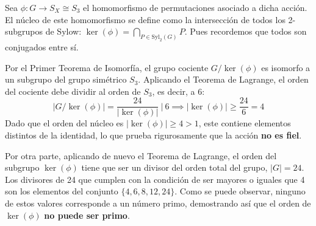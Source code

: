 \documentclass[12pt]{article}
\begin{document}
\begin{ejercicio}[0.5 puntos]
\begin{enumerate}[label=\alph*)]
            Sea $\phi: G \to S_X \cong S_3$ el homomorfismo de permutaciones asociado a dicha acción. El núcleo de este homomorfismo se define como la intersección de todos los 2-subgrupos de Sylow: $\ker(\phi) = \bigcap_{P \in \text{Syl}_2(G)} P$. Pues recordemos que todos son conjugados entre sí.
            
            Por el Primer Teorema de Isomorfía, el grupo cociente $G/\ker(\phi)$ es isomorfo a un subgrupo del grupo simétrico $S_3$. Aplicando el Teorema de Lagrange, el orden del cociente debe dividir al orden de $S_3$, es decir, a $6$:
            \[ |G/\ker(\phi)| = \frac{24}{|\ker(\phi)|} \ \Big| \ 6 \implies |\ker(\phi)| \ge \frac{24}{6} = 4 \]
            Dado que el orden del núcleo es $|\ker(\phi)| \ge 4 > 1$, este contiene elementos distintos de la identidad, lo que prueba rigurosamente que la acción \textbf{no es fiel}.
            
            Por otra parte, aplicando de nuevo el Teorema de Lagrange, el orden del subgrupo $\ker(\phi)$ tiene que ser un divisor del orden total del grupo, $|G|=24$. Los divisores de 24 que cumplen con la condición de ser mayores o iguales que 4 son los elementos del conjunto $\{4, 6, 8, 12, 24\}$. Como se puede observar, ninguno de estos valores corresponde a un número primo, demostrando así que el orden de $\ker(\phi)$ \textbf{no puede ser primo}.
        \end{enumerate}
    \end{ejercicio}
\end{document}
